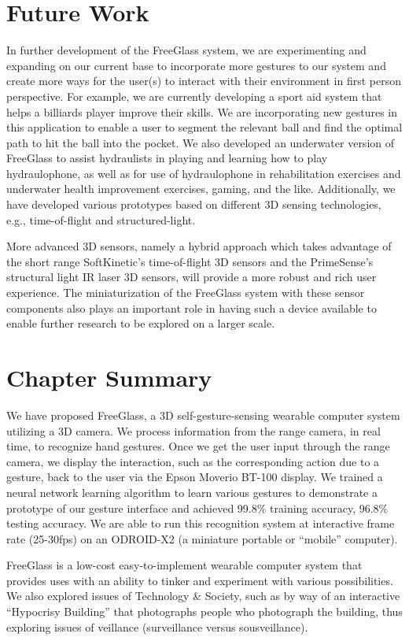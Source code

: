 \section{Future Work}
In further development of the FreeGlass system, we are experimenting and
expanding on our current base to incorporate more gestures to our system
and create more ways for the user(s) to interact with their environment in
first person perspective. For example, we are currently developing a sport
aid system that helps a billiards player improve their skills. We are
incorporating new gestures in this application to enable a user to segment
the relevant ball and find the optimal path to hit the ball into the pocket.
We also developed an underwater version of FreeGlass to assist hydraulists
in playing and learning how to play hydraulophone, as well as for use of
hydraulophone in rehabilitation exercises and underwater health improvement
exercises, gaming, and the like.
Additionally, we have developed various prototypes based on different 3D
sensing technologies, e.g., time-of-flight and structured-light.

More advanced 3D sensors, namely a hybrid approach which takes advantage
of the short range SoftKinetic's time-of-flight 3D sensors and
the PrimeSense's structural light IR laser 3D sensors, will provide a
more robust and rich user experience. The miniaturization of the FreeGlass
system with these sensor components also plays an important role in having
such a device available to enable further research
to be explored on a larger scale.

\section{Chapter Summary}
We have proposed FreeGlass, a 3D self-gesture-sensing wearable computer system utilizing a 3D camera.
We process information from the range camera, in real time, to recognize
hand gestures. Once we get the user input through the range camera, we
display the interaction, such as the corresponding action due to a gesture,
back to the user via the Epson Moverio BT-100 display. We trained a
neural network learning algorithm to learn various gestures
to demonstrate a prototype of our gesture interface
and achieved 99.8\% training accuracy, 96.8\% testing accuracy.
We are able to run this recognition system at interactive frame rate
(25-30fps) on an ODROID-X2 (a miniature portable or ``mobile'' computer).

FreeGlass is a low-cost easy-to-implement wearable computer system that
provides uses with an ability to tinker and experiment with various
possibilities.  We also explored issues of Technology \& Society,
such as by way of an interactive ``Hypocrisy Building'' that photographs
people who photograph the building, thus exploring issues of
veillance (surveillance versus sousveillance).


